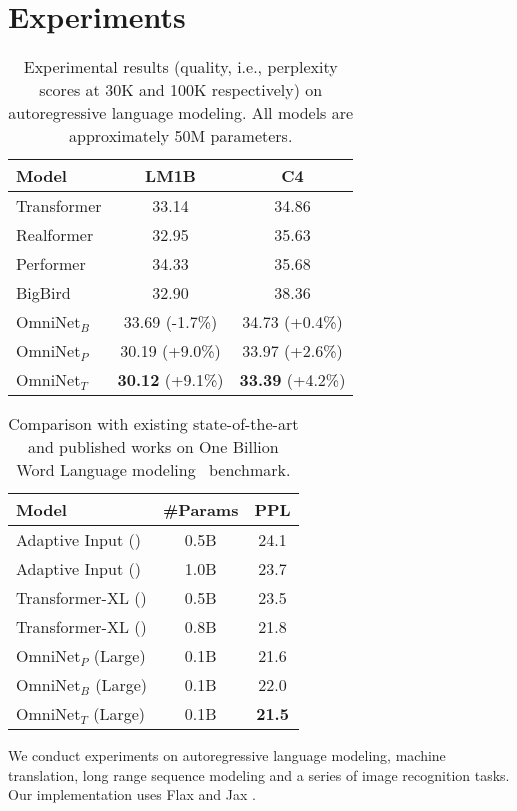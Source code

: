 \documentclass{article}
\begin{document}
\section{Experiments}
\begin{table}[t]
    \vspace{-5pt}
    \centering
    \caption{Experimental results (quality, i.e., perplexity scores at 30K and 100K respectively) on autoregressive language modeling. All models are approximately 50M parameters.}
    \begin{tabular}{l|cc}
    \toprule 
      Model   & LM1B & C4 
      \\
      \midrule
      Transformer   & 33.14  & 34.86 \\
      Realformer &32.95 & 35.63 \\
      Performer & 34.33 & 35.68\\ 
      BigBird & 32.90 &  38.36\\ 
      \midrule
      OmniNet$_B$ &33.69 (-1.7\%)  & 34.73 (+0.4\%) \\
      OmniNet$_P$ & 30.19 (+9.0\%) & 33.97 (+2.6\%) \\
      OmniNet$_T$ &\textbf{30.12} (+9.1\%) & \textbf{33.39} (+4.2\%)\\
      \bottomrule
    \end{tabular}
    \label{tab:lmexp}
    \vspace{-18pt}
\end{table}

\begin{table}[t]
    \centering
    \caption{Comparison with existing state-of-the-art and published works on One Billion Word Language modeling~\citep{chelba2013one} benchmark.}
    \begin{tabular}{l|cc}
    \toprule
        Model & \#Params &PPL  \\
        \midrule
        Adaptive Input (\citeauthor{baevski2018adaptive}) & 0.5B&24.1 \\
        Adaptive Input (\citeauthor{baevski2018adaptive}) & 1.0B &23.7 \\ 
         Transformer-XL (\citeauthor{dai2019transformer}) &0.5B &23.5\\
         Transformer-XL (\citeauthor{dai2019transformer}) & 0.8B &21.8\\ 
         \midrule
         OmniNet$_P$ (Large) & 0.1B & 21.6 \\
         OmniNet$_B$ (Large) & 0.1B & 22.0\\ 
         OmniNet$_T$ (Large)  & 0.1B & \textbf{21.5}\\ 
         \bottomrule
    \end{tabular}
    \label{tab:lmsota}
    \vspace{-15pt}
\end{table}
We conduct experiments on autoregressive language modeling, machine translation, long range sequence modeling and a series of image recognition tasks. Our implementation uses Flax \citep{flax2020github} and Jax \citep{jax2018github}.
\end{document}

